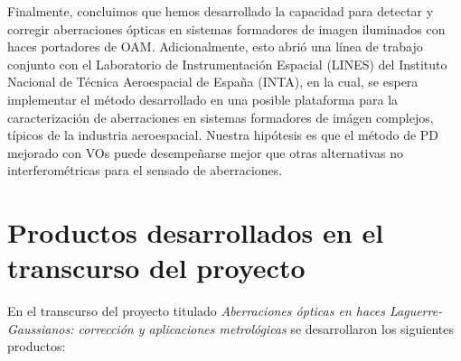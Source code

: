 Finalmente, concluimos que hemos desarrollado la capacidad para
  detectar y corregir aberraciones ópticas en sistemas formadores de imagen
  iluminados con haces portadores de OAM. Adicionalmente, esto abrió una
  línea de trabajo conjunto con el Laboratorio de Instrumentación
  Espacial (LINES) del Instituto Nacional de Técnica Aeroespacial de
  España (INTA), en la cual, se espera implementar el método desarrollado
  en una posible plataforma para la caracterización de aberraciones en
  sistemas formadores de imágen complejos, típicos de la industria
  aeroespacial. Nuestra hipótesis es que el método de PD mejorado con
  VOs puede desempeñarse mejor que otras alternativas no interferométricas para
  el sensado de aberraciones.

\section{Productos desarrollados en el transcurso del proyecto}

En el transcurso del proyecto titulado \textit{Aberraciones ópticas en haces Laguerre-Gaussianos: corrección
  y aplicaciones metrológicas} se desarrollaron los siguientes
productos:

